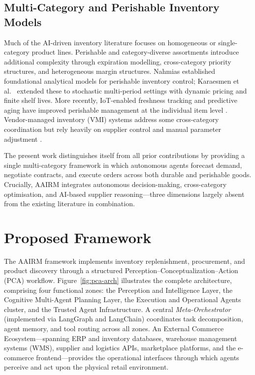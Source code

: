 \documentclass[utf8]{FrontiersinHarvard}
\begin{document}
	\subsection{Multi-Category and Perishable Inventory Models}

	Much of the AI-driven inventory literature focuses on homogeneous or
	single-category product lines.  Perishable and category-diverse assortments
	introduce additional complexity through expiration modelling, cross-category
	priority structures, and heterogeneous margin structures.  Nahmias
	\cite{nahmias1982perishable} established foundational analytical models for
	perishable inventory control; Karaesmen et al.\ \cite{karaesmen2011perishable}
	extended these to stochastic multi-period settings with dynamic pricing and
	finite shelf lives.  More recently, IoT-enabled freshness tracking and
	predictive aging have improved perishable management at the individual item
	level \cite{duan2022iot}.  Vendor-managed inventory (VMI) systems address
	some cross-category coordination but rely heavily on supplier control and
	manual parameter adjustment \cite{sari2008collaborative}.

	The present work distinguishes itself from all prior contributions by
	providing a single multi-category framework in which autonomous agents
	forecast demand, negotiate contracts, and execute orders across both durable
	and perishable goods.  Crucially, AAIRM integrates autonomous
	decision-making, cross-category optimisation, and AI-based supplier
	reasoning---three dimensions largely absent from the existing literature
	in combination.

	\section{Proposed Framework}
	\label{sec:framework}

	The AAIRM framework implements inventory replenishment, procurement, and
	product discovery through a structured Perception--Conceptualization--Action
	(PCA) workflow.  Figure~\ref{fig:pca-arch} illustrates the complete
	architecture, comprising four functional zones: the Perception and
	Intelligence Layer, the Cognitive Multi-Agent Planning Layer, the Execution
	and Operational Agents cluster, and the Trusted Agent Infrastructure.  A
	central \emph{Meta-Orchestrator} (implemented via LangGraph and LangChain)
	coordinates task decomposition, agent memory, and tool routing across all
	zones.  An External Commerce Ecosystem---spanning ERP and inventory
	databases, warehouse management systems (WMS), supplier and logistics APIs,
	marketplace platforms, and the e-commerce frontend---provides the operational
	interfaces through which agents perceive and act upon the physical retail
	environment.
\end{document}
